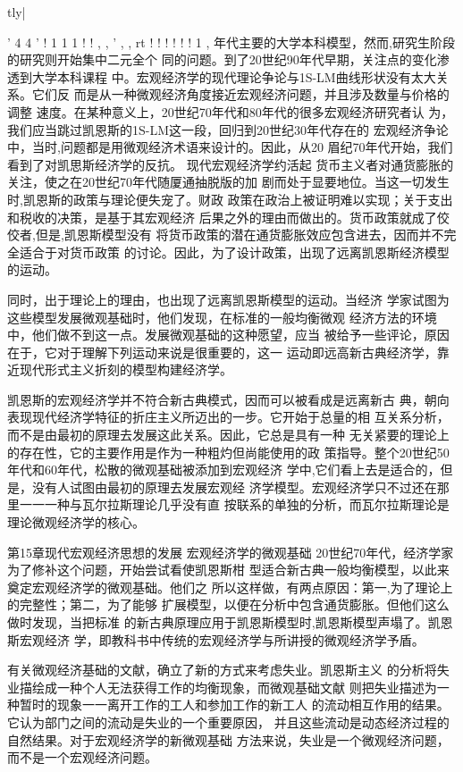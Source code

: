 tly|






'
4
4
'
!
1
1
1
!
!
,
,
'
,
,
rt
!
!
!
!
!
!
1
,
年代主要的大学本科模型，然而,研究生阶段的研究则开始集中二元全个
同的问题。到了20世纪90年代早期，关注点的变化渗透到大学本科课程
中。宏观经济学的现代理论争论与1S-LM曲线形状没有太大关系。它们反
而是从一种微观经济角度接近宏观经济问题，并且涉及数量与价格的调整
速度。在某种意义上，20世纪70年代和80年代的很多宏观经济研究者认
为，我们应当跳过凯恩斯的1S-LM这一段，回归到20世纪30年代存在的
宏观经济争论中，当时,问题都是用微观经济术语来设计的。因此，从20
眉纪70年代开始，我们看到了对凯思斯经济学的反抗。
现代宏观经济学约活起
货币主义者对通货膨胀的关注，使之在20世纪70年代随厦通抽脱版的加
剧而处于显要地位。当这一切发生时,凯恩斯的政策与理论便失宠了。财政
政策在政治上被证明难以实现；关于支出和税收的决策，是基于其宏观经济
后果之外的理由而做出的。货币政策就成了佼佼者,但是,凯恩斯模型没有
将货币政策的潜在通货膨胀效应包含进去，因而并不完全适合于对货币政策
的讨论。因此，为了设计政策，出现了远离凯恩斯经济模型的运动。

同时，出于理论上的理由，也出现了远离凯恩斯模型的运动。当经济
学家试图为这些模型发展微观基础时，他们发现，在标准的一般均衡微观
经济方法的环境中，他们做不到这一点。发展微观基础的这种愿望，应当
被给予一些评论，原因在于，它对于理解下列运动来说是很重要的，这一
运动即远高新古典经济学，靠近现代形式主义折刻的模型构建经济学。

凯恩斯的宏观经济学并不符合新古典模式，因而可以被看成是远离新古
典，朝向表现现代经济学特征的折庄主义所迈出的一步。它开始于总量的相
互关系分析，而不是由最初的原理去发展这此关系。因此，它总是具有一种
无关紧要的理论上的存在性，它的主要作用是作为一种粗灼但尚能使用的政
策指导。整个20世纪50年代和60年代，松散的微观基础被添加到宏观经济
学中,它们看上去是适合的，但是，没有人试图由最初的原理去发展宏观经
济学模型。宏观经济学只不过还在那里一一一种与瓦尔拉斯理论几乎没有直
按联系的单独的分析，而瓦尔拉斯理论是理论微观经济学的核心。

第15章现代宏观经济思想的发展
宏观经济学的微观基础
20世纪70年代，经济学家为了修补这个问题，开始尝试看使凯恩斯柑
型适合新古典一般均衡模型，以此来奠定宏观经济学的微观基础。他们之
所以这样做，有两点原因：第一,为了理论上的完整性；第二，为了能够
扩展模型，以便在分析中包含通货膨胀。但他们这么做时发现，当把标准
的新古典原理应用于凯恩斯模型时,凯恩斯模型声塌了。凯恩斯宏观经济
学，即教科书中传统的宏观经济学与所讲授的微观经济学予盾。

有关微观经济基础的文献，确立了新的方式来考虑失业。凯恩斯主义
的分析将失业描绘成一种个人无法获得工作的均衡现象，而微观基础文献
则把失业描述为一种暂时的现象一一离开工作的工人和参加工作的新工人
的流动相互作用的结果。它认为部门之间的流动是失业的一个重要原因，
并且这些流动是动态经济过程的自然结果。对于宏观经济学的新微观基础
方法来说，失业是一个微观经济问题，而不是一个宏观经济问题。

